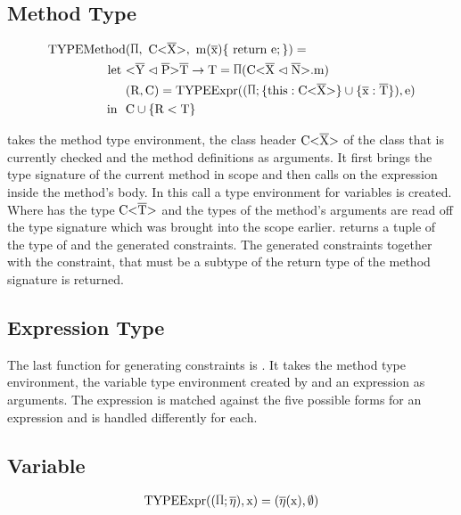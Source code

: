 \subsection{Method Type}

\begin{align*}
    \text{TYPEMethod}&(\sprod{0.7}, \ \text{C<} \ot{X} \text{>}, \ \text{m} ( \ot{x} ) \{ \ \text{return e}; \} ) = \\
    \text{let} \ &\yp \oto{\text{T}} = \sprod{0.7} ( \cm ) \\
    & ( \text{R}, \text{C} ) = \text{TYPEExpr} (( \sprod{0.7}; \{ \text{this} : \text{C<} \ot{X} \text{>} \} \cup \{ \ot{x} : \ot{T} \} ) , \text{e} ) \\
    \text{in} \ \  & \text{C} \cup \{ \text{R} < \text{T} \}\\
\end{align*}

 takes the method type environment, the class header $\text{C<}\overline{\text{X}}\text{>}$ of the class that is currently checked and the method definitions as arguments.
It first brings the type signature of the current method in scope and then calls  on the expression  inside the method's body. In this call a type environment for variables is created. Where  has the type $\text{C<}\overline{\text{T}}\text{>}$ and the types of the method's arguments are read off the type signature which was brought into the scope earlier.
 returns a tuple of the type  of  and the generated constraints. The generated constraints together with the constraint, that  must be a subtype of the return type of the method signature is returned.

\subsection{Expression Type}
The last function for generating constraints is . It takes the method type environment, the variable type environment created by  and an expression  as arguments.
The expression  is matched against the five possible forms for an expression and is handled differently for each.

\subsection{Variable}

\begin{align*}
    \texpr{\text{x}} = (\overline{\eta} (\text{x}), \emptyset)\\
\end{align*}

